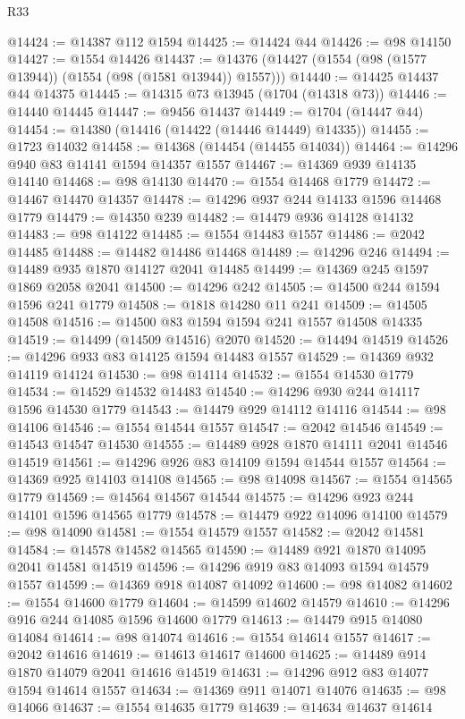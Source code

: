 \begin{lexlean}{R33}
\begin{coremodule}
@14424 := @14387 @112 @1594
@14425 := @14424 @44
@14426 := @98 @14150
@14427 := @1554 @14426
@14437 := @14376 (@14427 (@1554 (@98 (@1577 @13944)) (@1554 (@98 (@1581 @13944)) @1557)))
@14440 := @14425 @14437 @44 @14375
@14445 := @14315 @73 @13945 (@1704 (@14318 @73))
@14446 := @14440 @14445
@14447 := @9456 @14437
@14449 := @1704 (@14447 @44)
@14454 := @14380 (@14416 (@14422 (@14446 @14449) @14335))
@14455 := @1723 @14032
@14458 := @14368 (@14454 (@14455 @14034))
@14464 := @14296 @940 @83 @14141 @1594 @14357 @1557
@14467 := @14369 @939 @14135 @14140
@14468 := @98 @14130
@14470 := @1554 @14468 @1779
@14472 := @14467 @14470 @14357
@14478 := @14296 @937 @244 @14133 @1596 @14468 @1779
@14479 := @14350 @239
@14482 := @14479 @936 @14128 @14132
@14483 := @98 @14122
@14485 := @1554 @14483 @1557
@14486 := @2042 @14485
@14488 := @14482 @14486 @14468
@14489 := @14296 @246
@14494 := @14489 @935 @1870 @14127 @2041 @14485
@14499 := @14369 @245 @1597 @1869 @2058 @2041
@14500 := @14296 @242
@14505 := @14500 @244 @1594 @1596 @241 @1779
@14508 := @1818 @14280 @11 @241
@14509 := @14505 @14508
@14516 := @14500 @83 @1594 @1594 @241 @1557 @14508 @14335
@14519 := @14499 (@14509 @14516) @2070
@14520 := @14494 @14519
@14526 := @14296 @933 @83 @14125 @1594 @14483 @1557
@14529 := @14369 @932 @14119 @14124
@14530 := @98 @14114
@14532 := @1554 @14530 @1779
@14534 := @14529 @14532 @14483
@14540 := @14296 @930 @244 @14117 @1596 @14530 @1779
@14543 := @14479 @929 @14112 @14116
@14544 := @98 @14106
@14546 := @1554 @14544 @1557
@14547 := @2042 @14546
@14549 := @14543 @14547 @14530
@14555 := @14489 @928 @1870 @14111 @2041 @14546 @14519
@14561 := @14296 @926 @83 @14109 @1594 @14544 @1557
@14564 := @14369 @925 @14103 @14108
@14565 := @98 @14098
@14567 := @1554 @14565 @1779
@14569 := @14564 @14567 @14544
@14575 := @14296 @923 @244 @14101 @1596 @14565 @1779
@14578 := @14479 @922 @14096 @14100
@14579 := @98 @14090
@14581 := @1554 @14579 @1557
@14582 := @2042 @14581
@14584 := @14578 @14582 @14565
@14590 := @14489 @921 @1870 @14095 @2041 @14581 @14519
@14596 := @14296 @919 @83 @14093 @1594 @14579 @1557
@14599 := @14369 @918 @14087 @14092
@14600 := @98 @14082
@14602 := @1554 @14600 @1779
@14604 := @14599 @14602 @14579
@14610 := @14296 @916 @244 @14085 @1596 @14600 @1779
@14613 := @14479 @915 @14080 @14084
@14614 := @98 @14074
@14616 := @1554 @14614 @1557
@14617 := @2042 @14616
@14619 := @14613 @14617 @14600
@14625 := @14489 @914 @1870 @14079 @2041 @14616 @14519
@14631 := @14296 @912 @83 @14077 @1594 @14614 @1557
@14634 := @14369 @911 @14071 @14076
@14635 := @98 @14066
@14637 := @1554 @14635 @1779
@14639 := @14634 @14637 @14614

\end{coremodule}
\end{lexlean}
